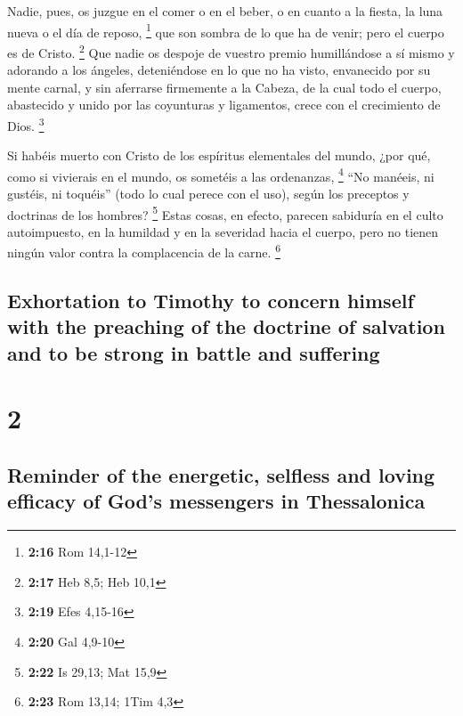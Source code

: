 \begin{paracol}{2}
 Nadie, pues, os juzgue en el comer o en el beber, o en
cuanto a la fiesta, la luna nueva o el día de reposo, \footnote{\textbf{2:16}
  Rom 14,1-12}  que son sombra de lo que ha de venir;
pero el cuerpo es de Cristo. \footnote{\textbf{2:17} Heb 8,5; Heb 10,1}
 Que nadie os despoje de vuestro premio humillándose a sí
mismo y adorando a los ángeles, deteniéndose en lo que no ha visto,
envanecido por su mente carnal,  y sin aferrarse
firmemente a la Cabeza, de la cual todo el cuerpo, abastecido y unido
por las coyunturas y ligamentos, crece con el crecimiento de Dios.
\footnote{\textbf{2:19} Efes 4,15-16}

 Si habéis muerto con Cristo de los espíritus elementales
del mundo, ¿por qué, como si vivierais en el mundo, os sometéis a las
ordenanzas, \footnote{\textbf{2:20} Gal 4,9-10}  ``No
manéeis, ni gustéis, ni toquéis''  (todo lo cual perece
con el uso), según los preceptos y doctrinas de los hombres? \footnote{\textbf{2:22}
  Is 29,13; Mat 15,9}  Estas cosas, en efecto, parecen
sabiduría en el culto autoimpuesto, en la humildad y en la severidad
hacia el cuerpo, pero no tienen ningún valor contra la complacencia de
la carne. \footnote{\textbf{2:23} Rom 13,14; 1Tim 4,3}

\switchcolumn
\begin{otherlanguage}{english}

\hypertarget{exhortation-to-timothy-to-concern-himself-with-the-preaching-of-the-doctrine-of-salvation-and-to-be-strong-in-battle-and-suffering}{%
\subsection{Exhortation to Timothy to concern himself with the preaching
of the doctrine of salvation and to be strong in battle and
suffering}\label{exhortation-to-timothy-to-concern-himself-with-the-preaching-of-the-doctrine-of-salvation-and-to-be-strong-in-battle-and-suffering}}

\hypertarget{section-3}{%
\section{2}\label{section-3}}

\hypertarget{reminder-of-the-energetic-selfless-and-loving-efficacy-of-gods-messengers-in-thessalonica}{%
\subsection{Reminder of the energetic, selfless and loving efficacy of
God's messengers in
Thessalonica}\label{reminder-of-the-energetic-selfless-and-loving-efficacy-of-gods-messengers-in-thessalonica}}


\end{otherlanguage}
\end{paracol}
